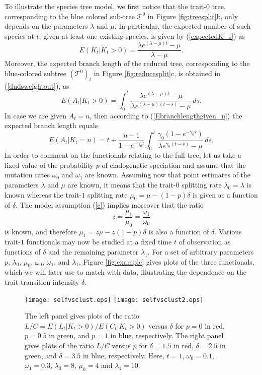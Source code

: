 \documentclass[a4paper,11pt]{article}
\theoremstyle{plain}
\theoremstyle{definition}
\numberwithin{equation}{section}
\begin{document}
To illustrate the species tree model, we first notice that the
trait-$0$ tree, corresponding to the blue colored sub-tree $\mathcal T^0$ in Figure
\ref{fig:treesplit}b, only depends on the parameters $\lambda$ and $\mu$.
In particular, the expected number of such species at $t$, given at
least one existing species, is given by (\ref{expectedK_s}) as 
\[
 E(K_t|K_t>0)=\frac{\lambda e^{(\lambda-\mu)t}-\mu}{\lambda-\mu}.
\]
Moreover, the expected branch length of the reduced tree,
corresponding to the blue-colored subtree $(\mathcal T^0)_t$ in Figure
\ref{fig:reducesplit}c, is obtained in (\ref{dndsweightout}), as 
\[
E(A_t|K_t>0)=\int_0^t \frac{\lambda e^{(\lambda-\mu) t}-\mu}{\lambda
  e^{(\lambda-\mu)(t-s)}-\mu}\,ds.   
\]
In case we are given $A_t=n$, then according to
(\ref{Ebranchlengthgiven_n}) the expected branch length equals
\[
E(A_t|K_t=n)=
t+\frac{n-1}{1-e^{-\gamma_0 t}} \int_0^t  \frac{\gamma_0
  (1-e^{-\gamma_0 s})} {\lambda e^{\gamma_0(t-s)}-\mu}\,ds.
\]
In order to comment on the functionals relating to the full tree, let
us take a fixed value of the probability $p$ of cladogenetic speciation
and assume that the mutation rates $\omega_0$ and $\omega_1$ are
known. Assuming now that point estimates of the parameters $\lambda$
and $\mu$ are known, it means that the trait-$0$ splitting rate
$\lambda_0=\lambda$ is known whereas the trait-$1$ splitting rate
$\mu_0=\mu-(1-p)\delta$ is given as a function of $\delta$. The model
assumption (\ref{c}) implies moreover that the ratio
\[
z=\frac{\mu_1}{\mu_0}=\frac{\omega_1}{\omega_0}
\]
is known, and therefore $\mu_1=z\mu-z(1-p)\delta$ is also a function
of $\delta$.  Various trait-$1$ functionals may now be studied at a fixed time
$t$ of observation as functions of $\delta$ and the remaining
parameter $\lambda_1$. For a set of arbitrary parameters $p$,
$\lambda_0$, $\mu_0$, $\omega_0$, $\omega_1$, and $\lambda_1$, Figure
\ref{fig:example} gives plots of the three functionals, which we will later use to
match with data, illustrating the dependence on the trait transition
intensity $\delta$.



\begin{figure*}[!t]
\centerline{
\texttt{[image: selfvsclust.eps]}
\texttt{[image: selfvsclust2.eps]}}
\caption{The left panel gives plots of the 
ratio $L/C=E(L_t|K_t>0)/E(C_t|K_t>0)$ versus 
$\delta$ for $p=0$ in red, $p=0.5$ in green, 
and $p=1$ in blue, respectively. The right 
panel  gives plots of the ratio $L/C$ versus 
$p$ for $\delta=1.5$ in red, $\delta=2.5$ in 
green, and $\delta=3.5$ in blue, respectively. 
Here, $t=1$, $\omega_0=0.1$, $\omega_1=0.3$, $\lambda_0=8$,
$\mu_0=4$ and $\lambda_1=10$.}
\label{fig2:example}
\end{figure*}
\end{document}

